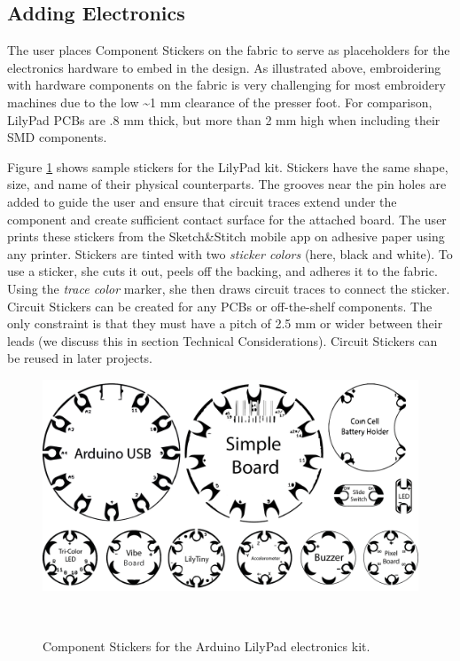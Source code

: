 \documentclass{sigchi}
\begin{document}
\subsection{Adding Electronics}
The user places Component Stickers on the fabric to serve as placeholders for the electronics hardware to embed in the design. As illustrated above, embroidering with hardware components on the fabric is very challenging for most embroidery machines due to the low \textasciitilde 1 mm clearance of the presser foot. For comparison, LilyPad PCBs are .8 mm thick, but more than 2 mm high when including their SMD components.

Figure \ref{fig:ComponentStickers} shows sample stickers for the LilyPad kit. Stickers have the same shape, size, and name of their physical counterparts.  
The grooves near the pin holes are added to guide the user and ensure that circuit traces extend under the component and create sufficient contact surface for the attached board. 
The user prints these stickers from the Sketch\&Stitch mobile app on adhesive paper using any printer. Stickers are tinted with two \textit{sticker colors} (here, black and white). To use a sticker, she cuts it out, peels off the backing, and adheres it to the fabric. %
Using the \textit{trace color} marker, she then draws circuit traces to connect the sticker. 
Circuit Stickers can be created for any PCBs or off-the-shelf components. The only constraint is that they must have a pitch of 2.5 mm or wider between their leads (we discuss this in section Technical Considerations). Circuit Stickers can be reused in later projects.


\begin{figure}
\centering
  \includegraphics[width=0.9\columnwidth]{figures/ComponentStickers.png}
  \caption{Component Stickers for the Arduino LilyPad electronics kit.}~\label{fig:ComponentStickers}
  \vspace{-1.5em}
\end{figure}
\end{document}
